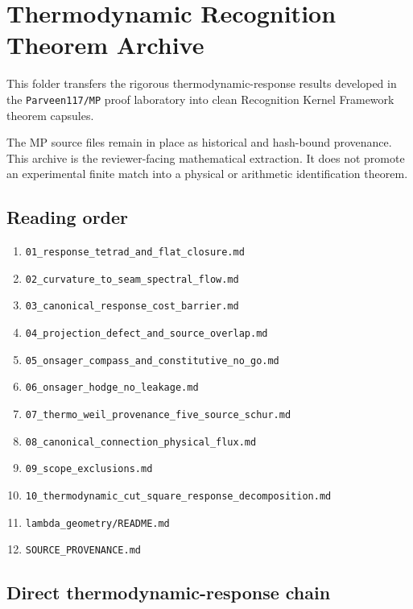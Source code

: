\hypertarget{thermodynamic-recognition-theorem-archive}{%
\chapter{Thermodynamic Recognition Theorem Archive}\label{thermodynamic-recognition-theorem-archive}}

This folder transfers the rigorous thermodynamic-response results developed in the \texttt{Parveen117/MP} proof laboratory into clean Recognition Kernel Framework theorem capsules.

The MP source files remain in place as historical and hash-bound provenance. This archive is the reviewer-facing mathematical extraction. It does not promote an experimental finite match into a physical or arithmetic identification theorem.

\hypertarget{reading-order}{%
\section{Reading order}\label{reading-order}}

\begin{enumerate}
\def\labelenumi{\arabic{enumi}.}
\tightlist
\item
  \texttt{01\_response\_tetrad\_and\_flat\_closure.md}
\item
  \texttt{02\_curvature\_to\_seam\_spectral\_flow.md}
\item
  \texttt{03\_canonical\_response\_cost\_barrier.md}
\item
  \texttt{04\_projection\_defect\_and\_source\_overlap.md}
\item
  \texttt{05\_onsager\_compass\_and\_constitutive\_no\_go.md}
\item
  \texttt{06\_onsager\_hodge\_no\_leakage.md}
\item
  \texttt{07\_thermo\_weil\_provenance\_five\_source\_schur.md}
\item
  \texttt{08\_canonical\_connection\_physical\_flux.md}
\item
  \texttt{09\_scope\_exclusions.md}
\item
  \texttt{10\_thermodynamic\_cut\_square\_response\_decomposition.md}
\item
  \texttt{lambda\_geometry/README.md}
\item
  \texttt{SOURCE\_PROVENANCE.md}
\end{enumerate}

\hypertarget{direct-thermodynamic-response-chain}{%
\section{Direct thermodynamic-response chain}\label{direct-thermodynamic-response-chain}}

